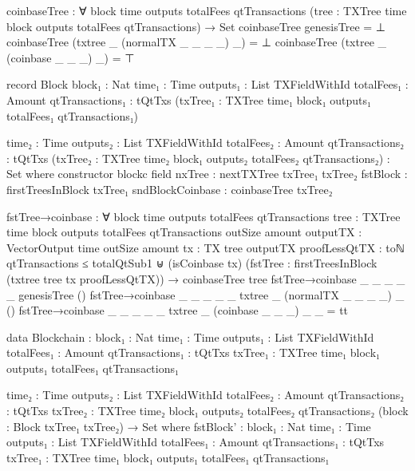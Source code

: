 \documentclass{beamer}
\begin{document}
\begin{code}
      coinbaseTree : ∀
        {block time outputs totalFees qtTransactions}
        (tree : TXTree time block outputs totalFees qtTransactions)
        → Set
      coinbaseTree genesisTree = ⊥
      coinbaseTree (txtree _ (normalTX _ _ _ _) _) = ⊥
      coinbaseTree (txtree _ (coinbase _ _ _) _) = ⊤

      record Block
        {block₁ : Nat}
        {time₁ : Time}
        {outputs₁ : List TXFieldWithId}
        {totalFees₁ : Amount}
        {qtTransactions₁ : tQtTxs}
        (txTree₁ : TXTree time₁ block₁ outputs₁ totalFees₁ qtTransactions₁)

        {time₂ : Time}
        {outputs₂ : List TXFieldWithId}
        {totalFees₂ : Amount}
        {qtTransactions₂ : tQtTxs}
        (txTree₂ : TXTree time₂ block₁ outputs₂ totalFees₂ qtTransactions₂)
        : Set where
        constructor blockc
        field
          nxTree           : nextTXTree txTree₁ txTree₂
          fstBlock         : firstTreesInBlock txTree₁
          sndBlockCoinbase : coinbaseTree txTree₂

      fstTree→coinbase : ∀
        {block time outputs totalFees qtTransactions}
        {tree : TXTree time block outputs totalFees qtTransactions}
        {outSize amount}
        {outputTX : VectorOutput time outSize amount}
        {tx : TX tree outputTX}
        {proofLessQtTX :
            toℕ qtTransactions ≤ totalQtSub1
            ⊎
            (isCoinbase tx)}
        (fstTree : firstTreesInBlock (txtree tree tx proofLessQtTX))
        → coinbaseTree tree
      fstTree→coinbase {_} {_} {_} {_} {_} {genesisTree} ()
      fstTree→coinbase {_} {_} {_} {_} {_} {txtree _ (normalTX _ _ _ _) _} ()
      fstTree→coinbase {_} {_} {_} {_} {_} {txtree _ (coinbase _ _ _) _} _ = tt

      data Blockchain :
        {block₁ : Nat}
        {time₁ : Time}
        {outputs₁ : List TXFieldWithId}
        {totalFees₁ : Amount}
        {qtTransactions₁ : tQtTxs}
        {txTree₁ : TXTree time₁ block₁ outputs₁ totalFees₁ qtTransactions₁}

        {time₂ : Time}
        {outputs₂ : List TXFieldWithId}
        {totalFees₂ : Amount}
        {qtTransactions₂ : tQtTxs}
        {txTree₂ : TXTree time₂ block₁ outputs₂ totalFees₂ qtTransactions₂}
        (block : Block txTree₁ txTree₂)
        → Set where
          fstBlock' :
            {block₁ : Nat}
            {time₁ : Time}
            {outputs₁ : List TXFieldWithId}
            {totalFees₁ : Amount}
            {qtTransactions₁ : tQtTxs}
            {txTree₁ : TXTree time₁ block₁ outputs₁ totalFees₁ qtTransactions₁}


\end{code}
\end{document}
